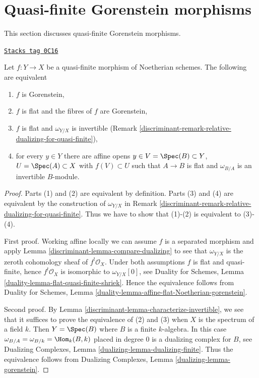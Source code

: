 \section{Quasi-finite Gorenstein morphisms}
\label{discriminant-section-gorenstein-lci}
This section discusses quasi-finite Gorenstein morphisms.

\begin{lemma}
\label{discriminant-lemma-gorenstein-quasi-finite}
\href{https://stacks.math.columbia.edu/tag/0C16}{\texttt{Stacks tag 0C16}}

Let $f : Y \to X$ be a quasi-finite morphism of Noetherian schemes.
The following are equivalent
\begin{enumerate}
\item $f$ is Gorenstein,
\item $f$ is flat and the fibres of $f$ are Gorenstein,
\item $f$ is flat and $\omega_{Y/X}$ is invertible
(Remark \ref{discriminant-remark-relative-dualizing-for-quasi-finite}),
\item for every $y \in Y$ there are affine opens
$y \in V = \Spec(B) \subset Y$, $U = \Spec(A) \subset X$
with $f(V) \subset U$ such that $A \to B$ is flat
and $\omega_{B/A}$ is an invertible $B$-module.
\end{enumerate}
\end{lemma}

\begin{proof}

Parts (1) and (2) are equivalent by definition. Parts (3) and (4)
are equivalent by the construction of $\omega_{Y/X}$ in
Remark \ref{discriminant-remark-relative-dualizing-for-quasi-finite}.
Thus we have to show that (1)-(2) is equivalent to (3)-(4).

\medskip\noindent
First proof. Working affine locally we can assume $f$ is a separated
morphism and apply Lemma \ref{discriminant-lemma-compare-dualizing} to see that
$\omega_{Y/X}$ is the zeroth cohomology sheaf of $f^!\mathcal{O}_X$.
Under both assumptions $f$ is flat and quasi-finite, hence
$f^!\mathcal{O}_X$ is isomorphic to $\omega_{Y/X}[0]$, see
Duality for Schemes, Lemma \ref{duality-lemma-flat-quasi-finite-shriek}. Hence
the equivalence follows from
Duality for Schemes, Lemma
\ref{duality-lemma-affine-flat-Noetherian-gorenstein}.

\medskip\noindent
Second proof. By Lemma \ref{discriminant-lemma-characterize-invertible},
we see that it suffices to prove the equivalence of
(2) and (3) when $X$ is the spectrum of a field $k$.
Then $Y = \Spec(B)$ where $B$ is a finite $k$-algebra.
In this case $\omega_{B/A} = \omega_{B/k} = \Hom_k(B, k)$
placed in degree $0$ is a dualizing complex for $B$, see
Dualizing Complexes, Lemma \ref{dualizing-lemma-dualizing-finite}.
Thus the equivalence follows from
Dualizing Complexes, Lemma \ref{dualizing-lemma-gorenstein}.
\end{proof}

